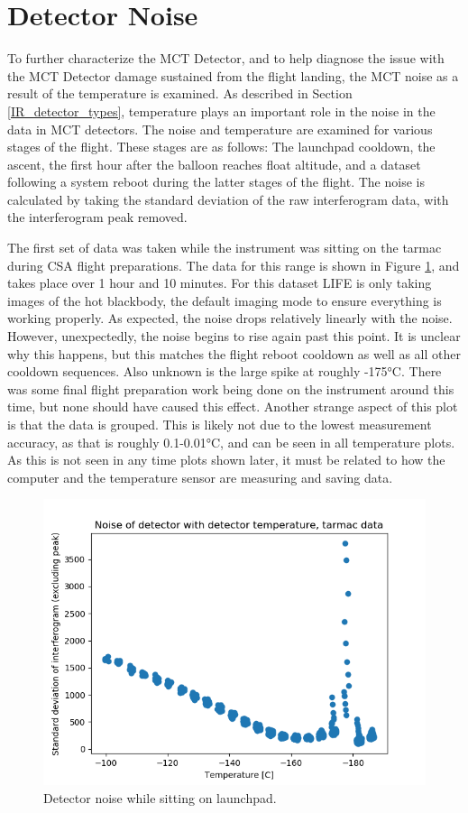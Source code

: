 \section{Detector Noise}\label{detector_noise_flight}
To further characterize the MCT Detector, and to help diagnose the issue with the MCT Detector damage sustained from the flight landing, the MCT noise as a result of the temperature is examined. As described in Section \ref{IR_detector_types}, temperature plays an important role in the noise in the data in MCT detectors. The noise and temperature are examined for various stages of the flight. These stages are as follows: The launchpad cooldown, the ascent, the first hour after the balloon reaches float altitude, and a dataset following a system reboot during the latter stages of the flight. The noise is calculated by taking the standard deviation of the raw interferogram data, with the interferogram peak removed.

The first set of data was taken while the instrument was sitting on the tarmac during CSA flight preparations. The data for this range is shown in Figure \ref{fig:tarmac_noise}, and takes place over 1 hour and 10 minutes. For this dataset LIFE is only taking images of the hot blackbody, the default imaging mode to ensure everything is working properly. As expected, the noise drops relatively linearly with the noise. However, unexpectedly, the noise begins to rise again past this point. It is unclear why this happens, but this matches the flight reboot cooldown as well as all other cooldown sequences. Also unknown is the large spike at roughly -175°C. There was some final flight preparation work being done on the instrument around this time, but none should have caused this effect. Another strange aspect of this plot is that the data is grouped. This is likely not due to the lowest measurement accuracy, as that is roughly 0.1-0.01°C, and can be seen in all temperature plots. As this is not seen in any time plots shown later, it must be related to how the computer and the temperature sensor are measuring and saving data.

\begin{figure}[h]
\centering
  \includegraphics[width=0.8\linewidth]{mct_noise_temp_plots/tarmac_noisevstemp_invertedx.png}
  \caption{Detector noise while sitting on launchpad.}
  \label{fig:tarmac_noise}
\end{figure}

